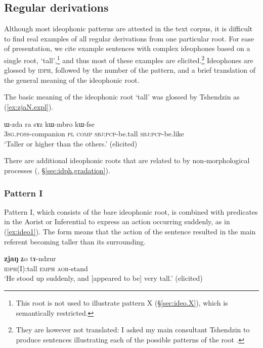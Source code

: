 \subsection{Regular derivations} \label{sec:ideo.regular}
 Although most ideophonic patterns are attested in the text corpus, it is difficult to find real examples of all regular derivations from one particular root. For ease of presentation, we cite example sentences with complex ideophones based on a single root,   `tall',\footnote{This root is not used to illustrate pattern X (§\ref{sec:ideo.X}), which is semantically restricted. } and thus most of these examples are elicited.\footnote{They are however not translated: I asked my main consultant Tshendzin to produce sentences illustrating each of the possible patterns of the root . } Ideophones are glossed by \textsc{idph}, followed by the number of the pattern, and a brief translation of the general meaning of the ideophonic root.

The basic meaning of the ideophonic root   `tall' was glossed by Tshendzin as (\ref{ex:zjaN.expl}).

\begin{exe} 
\ex \label{ex:zjaN.expl}
\gll ɯ-zda ra sɤz kɯ-mbro kɯ-fse \\
\textsc{3sg}.\textsc{poss}-companion \textsc{pl} \textsc{comp} \textsc{sbj}:\textsc{pcp}-be.tall \textsc{sbj}:\textsc{pcp}-be.like \\
\glt `Taller or higher than the others.' (elicited) 
\end{exe}

There are additional ideophonic roots that are related to  by non-morphological processes (, §\ref{sec:idph.gradation}).

 \subsubsection{Pattern I} \label{sec:ideo.I}
Pattern I, which consists of the bare ideophonic root, is combined with predicates in the Aorist or Inferential to express an action occurring suddenly, as in (\ref{ex:ideo1}). The form  means that the action of the sentence resulted in the main referent becoming taller than its surrounding.

\begin{exe} 
\ex \label{ex:ideo1}
\gll \textbf{zjaŋ} ʑo tɤ-ndzur  \\
\textsc{idph}(I):tall \textsc{emph} \textsc{aor}-stand \\
\glt `He stood up suddenly, and [appeared to be] very tall.'  (elicited)
\end{exe}
 
